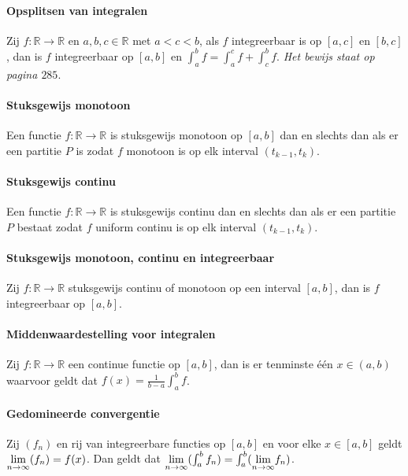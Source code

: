 \paragraph{Opsplitsen van integralen} Zij $f:\mathbb{R}\to\mathbb{R}$ en $a,b,c\in\mathbb{R}$ met $a<c<b$, als $f$ integreerbaar is op $[a,c]$ en $[b,c]$, dan is $f$ integreerbaar op $[a,b]$ en $\int_{a}^{b}f=\int_{a}^{c}f+\int_{c}^{b}f$. \textit{Het bewijs staat op pagina $285$}.

\paragraph{Stuksgewijs monotoon} Een functie $f:\mathbb{R}\to\mathbb{R}$ is stuksgewijs monotoon op $[a,b]$ dan en slechts dan als er een partitie $P$ is zodat $f$ monotoon is op elk interval $(t_{k-1},t_{k})$.

\paragraph{Stuksgewijs continu} Een functie $f:\mathbb{R}\to\mathbb{R}$ is stuksgewijs continu dan en slechts dan als er een partitie $P$ bestaat zodat $f$ uniform continu is op elk interval $(t_{k-1},t_{k})$.

\paragraph{Stuksgewijs monotoon, continu en integreerbaar} Zij $f:\mathbb{R}\to\mathbb{R}$ stuksgewijs continu of monotoon op een interval $[a,b]$, dan is $f$ integreerbaar op $[a,b]$.

\paragraph{Middenwaardestelling voor integralen} Zij $f:\mathbb{R}\to\mathbb{R}$ een continue functie op $[a,b]$, dan is er tenminste één $x\in(a,b)$ waarvoor geldt dat $f(x)=\frac{1}{b-a}\int_{a}^{b}f$.

\paragraph{Gedomineerde convergentie} Zij $(f_{n})$ en rij van integreerbare functies op $[a,b]$ en voor elke $x\in[a,b]$ geldt $\underset{n\to\infty}{\text{lim}}(f_{n})=f(x)$. Dan geldt dat $\underset{n\to\infty}{\text{lim}}(\int_{a}^{b}f_{n})=\int_{a}^{b}(\underset{n\to\infty}{\text{lim}}f_{n})$.
